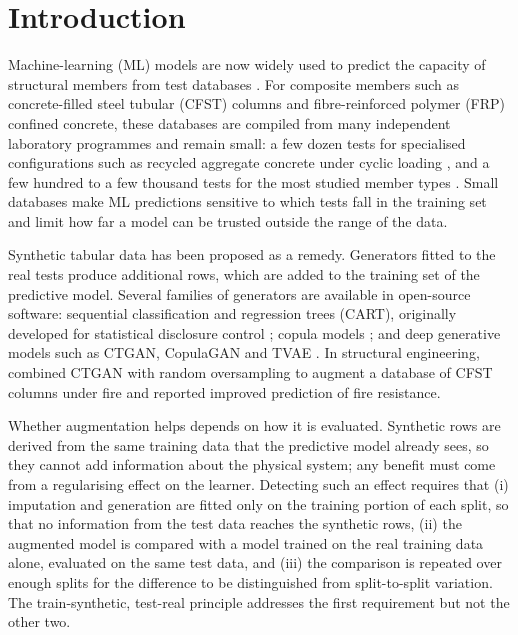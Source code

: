 \documentclass[pdflatex,sn-basic]{sn-jnl}
\begin{document}

\maketitle

\section{Introduction}\label{sec:intro}

Machine-learning (ML) models are now widely used to predict the capacity of structural members from test
databases \citep{thai2022review}. For composite members such as concrete-filled steel tubular (CFST) columns and
fibre-reinforced polymer (FRP) confined concrete, these databases are compiled from many independent laboratory
programmes and remain small: a few dozen tests for specialised configurations such as recycled aggregate concrete
under cyclic loading \citep{xu2020racfst}, and a few hundred to a few thousand tests for the most studied member
types \citep{thai2019cfst,ozbakkaloglu2013database}. Small databases make ML predictions sensitive to which tests
fall in the training set and limit how far a model can be trusted outside the range of the data.

Synthetic tabular data has been proposed as a remedy. Generators fitted to the real tests produce additional
rows, which are added to the training set of the predictive model. Several families of generators are available
in open-source software: sequential classification and regression trees (CART), originally developed for
statistical disclosure control \citep{reiter2005cart,nowok2016synthpop}; copula models \citep{patki2016sdv}; and
deep generative models such as CTGAN, CopulaGAN and TVAE \citep{xu2019ctgan}. In structural engineering,
\citet{song2024fire} combined CTGAN with random oversampling to augment a database of CFST columns under fire and
reported improved prediction of fire resistance.

Whether augmentation helps depends on how it is evaluated. Synthetic rows are derived from the same training data
that the predictive model already sees, so they cannot add information about the physical system; any benefit
must come from a regularising effect on the learner. Detecting such an effect requires that (i) imputation and
generation are fitted only on the training portion of each split, so that no information from the test data
reaches the synthetic rows, (ii) the augmented model is compared with a model trained on the real training data
alone, evaluated on the same test data, and (iii) the comparison is repeated over enough splits for the
difference to be distinguished from split-to-split variation. The train-synthetic, test-real principle
\citep{esteban2017tstr} addresses the first requirement but not the other two.
\end{document}
